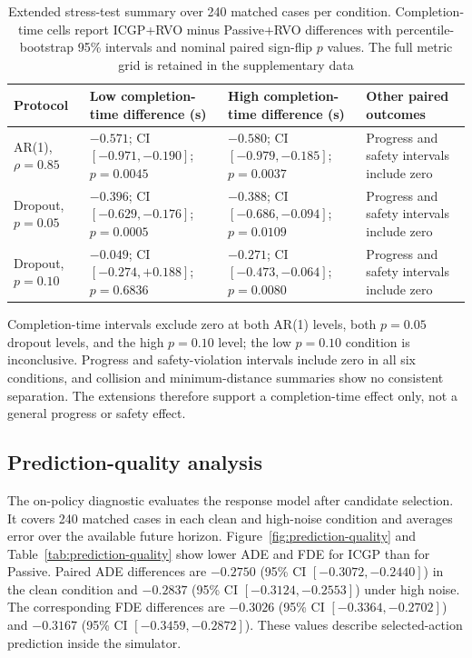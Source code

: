 \documentclass[pdflatex,sn-mathphys-num]{sn-jnl}
\begin{document}
\begin{table}[htbp]
\caption{Extended stress-test summary over 240 matched cases per condition. Completion-time cells report ICGP+RVO minus Passive+RVO differences with percentile-bootstrap 95\% intervals and nominal paired sign-flip $p$ values. The full metric grid is retained in the supplementary data}
\label{tab:stress}
\centering
\scriptsize
\setlength{\tabcolsep}{5pt}
\begin{tabular}{@{}>{\raggedright\arraybackslash}p{}>{\raggedright\arraybackslash}p{}>{\raggedright\arraybackslash}p{}>{\raggedright\arraybackslash}p{}@{}}
\toprule
Protocol & Low completion-time difference (s) & High completion-time difference (s) & Other paired outcomes \\
\midrule
AR(1), $\rho=0.85$ & $-0.571$; CI $[-0.971,-0.190]$; $p=0.0045$ & $-0.580$; CI $[-0.979,-0.185]$; $p=0.0037$ & Progress and safety intervals include zero \\
Dropout, $p=0.05$ & $-0.396$; CI $[-0.629,-0.176]$; $p=0.0005$ & $-0.388$; CI $[-0.686,-0.094]$; $p=0.0109$ & Progress and safety intervals include zero \\
Dropout, $p=0.10$ & $-0.049$; CI $[-0.274,+0.188]$; $p=0.6836$ & $-0.271$; CI $[-0.473,-0.064]$; $p=0.0080$ & Progress and safety intervals include zero \\
\bottomrule
\end{tabular}
\end{table}

Completion-time intervals exclude zero at both AR(1) levels, both $p=0.05$ dropout levels, and the high $p=0.10$ level; the low $p=0.10$ condition is inconclusive. Progress and safety-violation intervals include zero in all six conditions, and collision and minimum-distance summaries show no consistent separation. The extensions therefore support a completion-time effect only, not a general progress or safety effect.

\subsection{Prediction-quality analysis}
\label{sec:prediction-quality}

The on-policy diagnostic evaluates the response model after candidate selection. It covers 240 matched cases in each clean and high-noise condition and averages error over the available future horizon. Figure~\ref{fig:prediction-quality} and Table~\ref{tab:prediction-quality} show lower ADE and FDE for ICGP than for Passive. Paired ADE differences are $-0.2750$ (95\% CI $[-0.3072,-0.2440]$) in the clean condition and $-0.2837$ (95\% CI $[-0.3124,-0.2553]$) under high noise. The corresponding FDE differences are $-0.3026$ (95\% CI $[-0.3364,-0.2702]$) and $-0.3167$ (95\% CI $[-0.3459,-0.2872]$). These values describe selected-action prediction inside the simulator.
\end{document}

